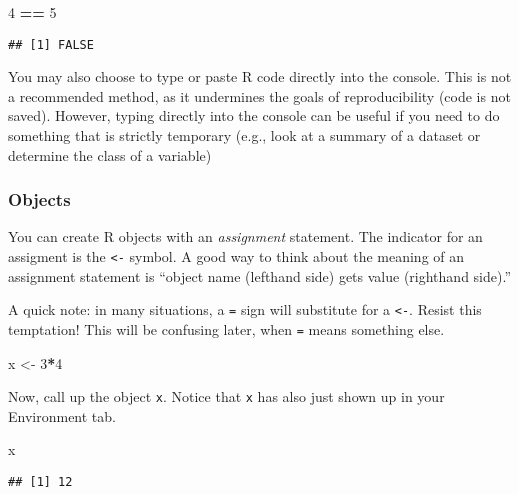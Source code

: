 \documentclass[]{article}
\newenvironment{Shaded}{\begin{snugshade}}{\end{snugshade}}
\newcommand{\DecValTok}[1]{\textcolor[rgb]{0.00,0.00,0.81}{#1}}
\newcommand{\StringTok}[1]{\textcolor[rgb]{0.31,0.60,0.02}{#1}}
\newcommand{\OperatorTok}[1]{\textcolor[rgb]{0.81,0.36,0.00}{\textbf{#1}}}
\newcommand{\NormalTok}[1]{#1}
\begin{document}
\begin{Shaded}
\begin{Highlighting}[]
\DecValTok{4} \OperatorTok{==}\StringTok{ }\DecValTok{5}
\end{Highlighting}
\end{Shaded}

\begin{verbatim}
## [1] FALSE
\end{verbatim}

You may also choose to type or paste R code directly into the console.
This is not a recommended method, as it undermines the goals of
reproducibility (code is not saved). However, typing directly into the
console can be useful if you need to do something that is strictly
temporary (e.g., look at a summary of a dataset or determine the class
of a variable)

\subsubsection{Objects}\label{objects}

You can create R objects with an \emph{assignment} statement. The
indicator for an assigment is the \texttt{\textless{}-} symbol. A good
way to think about the meaning of an assignment statement is ``object
name (lefthand side) gets value (righthand side).''

A quick note: in many situations, a \texttt{=} sign will substitute for
a \texttt{\textless{}-}. Resist this temptation! This will be confusing
later, when \texttt{=} means something else.

\begin{Shaded}
\begin{Highlighting}[]
\NormalTok{x <-}\StringTok{ }\DecValTok{3}\OperatorTok{*}\DecValTok{4}
\end{Highlighting}
\end{Shaded}

Now, call up the object \texttt{x}. Notice that \texttt{x} has also just
shown up in your Environment tab.

\begin{Shaded}
\begin{Highlighting}[]
\NormalTok{x}
\end{Highlighting}
\end{Shaded}

\begin{verbatim}
## [1] 12
\end{verbatim}
\end{document}
